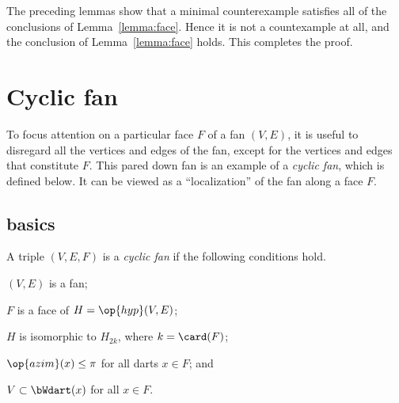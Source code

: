 The preceding lemmas show that a minimal counterexample satisfies all of the conclusions of Lemma~\ref{lemma:face}.  Hence it is not a countexample at all, and the conclusion of Lemma~\ref{lemma:face} holds.  This completes the proof.

\section{Cyclic fan}

\begin{summary}
To focus attention on a particular face $F$ of a fan $(V,E)$, it is useful to disregard all the vertices
and edges of the fan, except for the vertices and edges that constitute $F$.  This pared down fan
is an example of a {\it cyclic fan}, which is defined below.  It can be viewed as a ``localization'' of
the fan along a face $F$.  
\end{summary}
%

\subsection{basics}


\begin{definition}  A triple $(V,E,F)$ is a {\it cyclic fan} if the following conditions hold.
\begin{nomerate} 
\item {} $(V,E)$ is a fan;
\item {} $F$ is a face of $H = \op{hyp}(V,E)$;
\item {} $H$ is isomorphic to $H_{2k}$, where $k = \card(F)$;
\item {} $\op{azim}(x)\le \pi$ for all darts $x\in F$; and
\item {} $V\subset \bWdart(x)$ for all $x\in F$.
\end{nomerate}
\end{definition}
%

